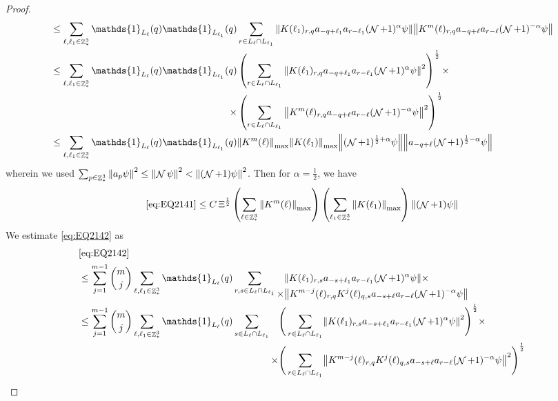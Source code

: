 \documentclass[sn-mathphys, Numbered ,a4paper]{sn-jnl}%
\DeclareMathOperator{\Z}{\mathbb{Z}}
\DeclareMathOperator{\NN}{\mathcal{N}}
\newcommand{\half}{\frac{1}{2}}
\theoremstyle{plain}
\theoremstyle{definition}
\theoremstyle{remark}
\theoremstyle{plain}
\theoremstyle{definition}
\theoremstyle{remark}
\begin{document}
\begin{proof}
\begin{align}
		&\leq \sum\limits_{\ell, \ell_1\in \Z^3_*} \mathds{1}_{L_{\ell}}(q) \mathds{1}_{L_{\ell_1}}(q) \sum\limits_{r\in L_{\ell} \cap L_{\ell_1}} \norm{ K(\ell_1)_{r,q} a_{-q+\ell_1} a_{r-\ell_1}(\NN+1)^{\alpha}\psi}\norm{ K^m(\ell)_{r,q} a_{-q+\ell}a_{r-\ell} (\NN+1)^{-\alpha} \psi }\nonumber\\
		&\leq \sum\limits_{\ell, \ell_1\in \Z^3_*} \mathds{1}_{L_{\ell}}(q) \begin{aligned}[t] \mathds{1}_{L_{\ell_1}}(q) &\left(\sum\limits_{r\in L_{\ell} \cap L_{\ell_1}} \norm{ K(\ell_1)_{r,q} a_{-q+\ell_1} a_{r-\ell_1}(\NN+1)^{\alpha}\psi}^2\right)^\half \times \nonumber\\ \times &\left(\sum\limits_{r\in L_{\ell} \cap L_{\ell_1}} \norm{ K^m(\ell)_{r,q} a_{-q+\ell}a_{r-\ell} (\NN+1)^{-\alpha} \psi }^2\right)^\half \end{aligned}\nonumber\\
		&\leq \sum\limits_{\ell, \ell_1\in \Z^3_*} \mathds{1}_{L_{\ell}}(q) \mathds{1}_{L_{\ell_1}}(q)  \norm{K^m(\ell)}_{\mathrm{max}} \norm{ K(\ell_1)}_{\mathrm{max}} \norm{ (\NN+1)^{\half+\alpha} \psi} \norm{  a_{-q+\ell} (\NN+1)^{\half-\alpha} \psi }\nonumber
	\end{align} 
	wherein we used $\sum_{p\in \Z^3_*}\norm{a_p \psi}^2\leq\norm{\NN\psi}^2<\norm{(\NN+1)\psi}^2$. Then for $\alpha =  \half $, we have 
	\begin{equation}
		\eqref{eq:EQ2141}\leq C\, \Xi^\half \left(\sum\limits_{\ell\in \Z^3_*} \norm{K^m(\ell)}_{\mathrm{max}}\right)\left(  \sum\limits_{ \ell_1\in \Z^3_*}  \norm{ K(\ell_1)}_{\mathrm{max}} \right) \norm{ (\NN+1) \psi}\label{eq:estEQ2141} 
	\end{equation}  
	We estimate \eqref{eq:EQ2142} as
	\begin{align}
		&\eqref{eq:EQ2142}\nonumber\\
		&\leq \sum\limits_{j=1}^{m-1} {{m}\choose j} \sum\limits_{\ell, \ell_1\in \Z^3_*}\mathds{1}_{L_{\ell}}(q) \sum\limits_{r,s \in L_{\ell} \cap L_{\ell_1}} \begin{aligned}[t] &\norm{ K(\ell_1)_{r,s}a_{-s+\ell_1} a_{r-\ell_1} (\NN+1)^{\alpha}\psi}\nonumber \times \\ \times&\norm{ K^{m-j}(\ell)_{r,q} K^{j}(\ell)_{q,s} a_{-s+\ell}a_{r-\ell} (\NN+1)^{-\alpha} \psi }\end{aligned} \nonumber\\
		&\leq \sum\limits_{j=1}^{m-1} {{m}\choose j} \sum\limits_{\ell, \ell_1\in \Z^3_*} \mathds{1}_{L_{\ell}}(q)  \sum\limits_{s\in L_{\ell} \cap L_{\ell_1}}   \begin{aligned}[t] \Bigg(\sum\limits_{ r \in L_{\ell} \cap L_{\ell_1}}&\norm{ K(\ell_1)_{r,s}a_{-s+\ell_1} a_{r-\ell_1} (\NN+1)^{\alpha}\psi}^2\Bigg)^\half\nonumber \times \\ \times\Bigg(  \sum\limits_{ r \in L_{\ell} \cap L_{\ell_1}}&\norm{ K^{m-j}(\ell)_{r,q} K^{j}(\ell)_{q,s} a_{-s+\ell}a_{r-\ell} (\NN+1)^{-\alpha} \psi }^2\Bigg)^\half\end{aligned} \nonumber\\

\end{align}
\end{proof}
\end{document}
